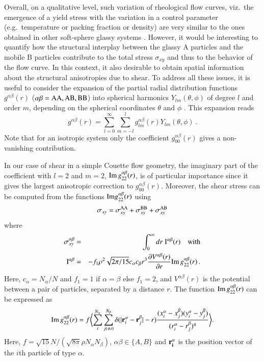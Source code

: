 Overall, on a qualitative level, such variation of rheological flow curves, viz.~the emergence of a yield stress with the variation in a control parameter (e.g.~temperature or packing fraction or density) are very similar to the ones obtained in other soft-sphere glassy systems \cite{ludovic2002, sollich2012, sollich2013, golkia2020, lamp2022}. However, it would be interesting to quantify how the structural interplay between the glassy A particles and the mobile B particles contribute to the total stress $\sigma_{xy}$ and thus to the behavior of the flow curve. In this context, it also desirable to obtain spatial information about the structural anisotropies due to shear. To address all these issues, it is useful to consider the expansion of the partial radial distribution functions $g^{\alpha\beta}(r)$ ($\alpha\beta = {\rm AA, AB, BB}$) into spherical harmonics $Y_{lm}(\theta, \phi)$ of degree $l$ and order $m$, depending on the spherical coordinates $\theta$ and $\phi$ \cite{hanley1987, rainwater1988, gan1992}. This expansion reads
%
\begin{equation}
  g^{\alpha \beta}(r) = \sum_{l=0}^{\infty} \sum_{m=-l}^{l} 
  g^{\alpha\beta}_{lm}(r) Y_{lm}(\theta, \phi) \, . 
\end{equation}
%
Note that for an isotropic system only the coefficient $g_{00}^{\alpha\beta}(r)$ gives a non-vanishing contribution.

In our case of shear in a simple Couette flow geometry, the imaginary part of the coefficient with $l=2$ and $m=2$, ${\rm Im} \, g_{22}^{\alpha\beta}(r)$, is of particular importance since it gives the largest anisotropic correction to $g_{00}^{\alpha\beta}(r)$. Moreover, the shear stress can be computed from the functions ${\rm Im} g_{22}^{\alpha\beta}(r)$ using
%
\begin{equation}
\sigma_{xy} = \sigma_{xy}^{\rm AA} + \sigma_{xy}^{\rm BB} + \sigma_{xy}^{\rm AB}
\label{eq_sigmag22}
\end{equation}
%
where
%
\begin{eqnarray}
\sigma_{xy}^{\alpha \beta} & = & 
\int_0^\infty dr \; {\rm I}^{\alpha\beta}(r) \quad {\rm with} \\
{\rm I}^{\alpha\beta} & = & - f_1 \rho^2 \sqrt{2\pi/15} c_{\alpha} c_{\beta} r^3 \frac{\partial V^{\alpha\beta}(r)}{\partial r}  {\rm Im} \, g_{22}^{\alpha\beta}(r) \, .
\label{eq_integrand}
\end{eqnarray}
%
Here, $c_{\alpha} = N_{\alpha}/N$ and $f_1 = 1$ if $\alpha = \beta$ else $f_1 = 2$, and $V^{\alpha\beta}(r)$ is the potential between a pair of particles, separated by a distance $r$. The function ${\rm Im} \, g_{22}^{\alpha\beta}(r)$ can be expressed as
%
\begin{equation}
{\rm Im} \, g_{22}^{\alpha \beta}(r) = f \biggl< \sum_{i}^{N_{\alpha}} \sum_{j (\neq i)}^{N_{\beta}} \delta(|{\bf r}_i^{\alpha} - {\bf r}_j^{\beta}| - r) \frac{(x_i^{\alpha}-x_j^{\beta})(y_i^{\alpha}-y_j^{\beta})}{(r_i^{\alpha}-r_j^{\beta})^4} \biggl>.
\label{eq_img22}
\end{equation}
%
Here, $f = \sqrt{15}N/(\sqrt{8\pi} \rho N_{\alpha}N_{\beta})$, $\alpha\beta \in \{A,B\}$ and $\bf{r}_i^{\alpha}$ is the position vector of the $i$th particle of type $\alpha$.

